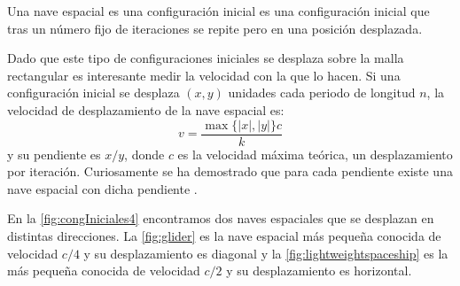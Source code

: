\documentclass[../proyecto.tex]{memoir}
\begin{document}

\begin{defi}
Una  nave espacial es una configuración inicial es una configuración inicial que tras un número fijo de iteraciones se repite pero en una posición desplazada.
\end{defi}

Dado que este tipo de configuraciones iniciales se desplaza sobre la malla rectangular es interesante medir la velocidad con la que lo hacen. Si una configuración inicial se desplaza $(x, y)$ unidades cada periodo de longitud $n$, la velocidad de desplazamiento de la nave espacial es: $$
 v = \frac{\max\{|x|,|y|\}c}{k}
 $$  y su pendiente es $x/y$, donde $c$ es la velocidad máxima teórica, un desplazamiento por iteración. Curiosamente se ha demostrado que para cada pendiente existe una nave espacial con dicha pendiente \cite{pendienteNaves}.

En la \autoref{fig:congIniciales4} encontramos dos naves espaciales que se desplazan en distintas direcciones. La \autoref{fig:glider} es la nave espacial más pequeña conocida de velocidad $c/4$ y su desplazamiento es diagonal y la \autoref{fig:lightweightspaceship} es la más pequeña conocida de velocidad $c/2$ y su desplazamiento es horizontal.
\end{document}
